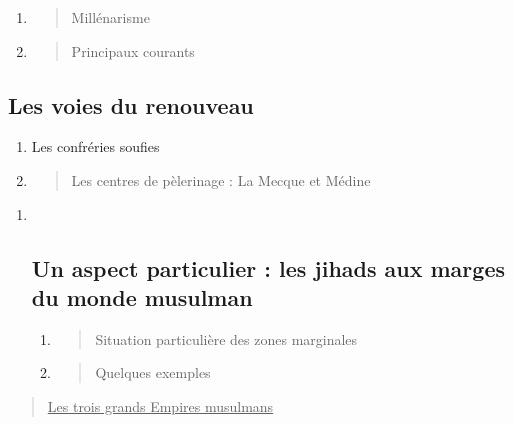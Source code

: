 \begin{enumerate}
\def\labelenumi{\arabic{enumi}.}
\setcounter{enumi}{2}
\item
  \begin{quote}
  Millénarisme
  \end{quote}
\item
  \begin{quote}
  Principaux courants
  \end{quote}
\end{enumerate}

\hypertarget{les-voies-du-renouveau}{%
\subsection{Les voies du renouveau}\label{les-voies-du-renouveau}}

\begin{enumerate}
\def\labelenumi{\arabic{enumi}.}
\setcounter{enumi}{3}
\item
  Les confréries soufies
\item
  \begin{quote}
  Les centres de pèlerinage : La Mecque et Médine
  \end{quote}
\end{enumerate}

\begin{enumerate}
\def\labelenumi{\Roman{enumi}.}
\setcounter{enumi}{3}
\item ~
  \hypertarget{un-aspect-particulier-les-jihads-aux-marges-du-monde-musulman}{%
  \subsection{Un aspect particulier : les jihads aux marges du monde
  musulman}\label{un-aspect-particulier-les-jihads-aux-marges-du-monde-musulman}}

  \begin{enumerate}
  \def\labelenumii{\arabic{enumii}.}
  \item
    \begin{quote}
    Situation particulière des zones marginales
    \end{quote}
  \item
    \begin{quote}
    Quelques exemples
    \end{quote}
  \end{enumerate}
\end{enumerate}

\begin{quote}
\underline{Les trois grands Empires musulmans}
\end{quote}

